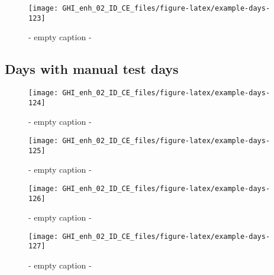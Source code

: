 \documentclass[
  10pt,
  a4paper,oneside]{article}
\begin{document}
\begin{figure}[H]

{\centering \texttt{[image: GHI\_enh\_02\_ID\_CE\_files/figure-latex/example-days-123]} 

}

\caption{ - empty caption - }\label{fig:example-days-123}
\end{figure}

\FloatBarrier

\hypertarget{days-with-manual-test-days}{%
\subsection{Days with manual test days}\label{days-with-manual-test-days}}

\begin{figure}[H]

{\centering \texttt{[image: GHI\_enh\_02\_ID\_CE\_files/figure-latex/example-days-124]} 

}

\caption{ - empty caption - }\label{fig:example-days-124}
\end{figure}

\begin{figure}[H]

{\centering \texttt{[image: GHI\_enh\_02\_ID\_CE\_files/figure-latex/example-days-125]} 

}

\caption{ - empty caption - }\label{fig:example-days-125}
\end{figure}

\begin{figure}[H]

{\centering \texttt{[image: GHI\_enh\_02\_ID\_CE\_files/figure-latex/example-days-126]} 

}

\caption{ - empty caption - }\label{fig:example-days-126}
\end{figure}

\begin{figure}[H]

{\centering \texttt{[image: GHI\_enh\_02\_ID\_CE\_files/figure-latex/example-days-127]} 

}

\caption{ - empty caption - }\label{fig:example-days-127}
\end{figure}

\newpage
\FloatBarrier
\end{document}

